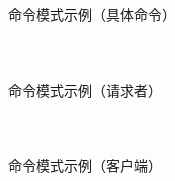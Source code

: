 \documentclass[UTF8,aspectratio=169]{beamer}
\begin{document}
\begin{frame}{命令模式示例（具体命令）}
    \begin{columns}
        \begin{column}{0.48\textwidth}
            \inputminted[firstline=82, lastline=100]{cpp}{code/command_pattern.cpp}
        \end{column}
        \begin{column}{0.48\textwidth}
            \inputminted[firstline=101, lastline=120]{cpp}{code/command_pattern.cpp}
        \end{column}
    \end{columns}
\end{frame}

\begin{frame}{命令模式示例（请求者）}
    \begin{columns}
        \begin{column}{0.48\textwidth}
            \inputminted[firstline=122, lastline=127]{cpp}{code/command_pattern.cpp}
        \end{column}
        \begin{column}{0.48\textwidth}
            \inputminted[firstline=129, lastline=147]{cpp}{code/command_pattern.cpp}
        \end{column}
    \end{columns}
\end{frame}

\begin{frame}{命令模式示例（客户端）}
    \begin{columns}
        \begin{column}{0.48\textwidth}
            \inputminted[firstline=153, lastline=172]{cpp}{code/command_pattern.cpp}
        \end{column}
        \begin{column}{0.48\textwidth}
            \inputminted[firstline=173, lastline=188]{cpp}{code/command_pattern.cpp}
        \end{column}
    \end{columns}
\end{frame}
\end{document}
